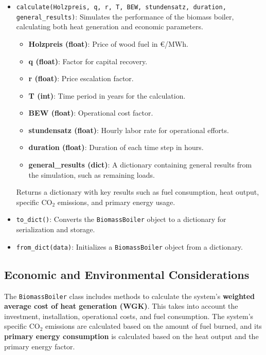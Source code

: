 \begin{itemize}
    \item \texttt{calculate(Holzpreis, q, r, T, BEW, stundensatz, duration, general\_results)}: Simulates the performance of the biomass boiler, calculating both heat generation and economic parameters.
    \begin{itemize}
        \item \textbf{Holzpreis (float)}: Price of wood fuel in €/MWh.
        \item \textbf{q (float)}: Factor for capital recovery.
        \item \textbf{r (float)}: Price escalation factor.
        \item \textbf{T (int)}: Time period in years for the calculation.
        \item \textbf{BEW (float)}: Operational cost factor.
        \item \textbf{stundensatz (float)}: Hourly labor rate for operational efforts.
        \item \textbf{duration (float)}: Duration of each time step in hours.
        \item \textbf{general\_results (dict)}: A dictionary containing general results from the simulation, such as remaining loads.
    \end{itemize}
    Returns a dictionary with key results such as fuel consumption, heat output, specific CO$_2$ emissions, and primary energy usage.

    \item \texttt{to\_dict()}: Converts the \texttt{BiomassBoiler} object to a dictionary for serialization and storage.

    \item \texttt{from\_dict(data)}: Initializes a \texttt{BiomassBoiler} object from a dictionary.
\end{itemize}

\subsection{Economic and Environmental Considerations}
The \texttt{BiomassBoiler} class includes methods to calculate the system’s \textbf{weighted average cost of heat generation (WGK)}. This takes into account the investment, installation, operational costs, and fuel consumption. The system’s specific CO$_2$ emissions are calculated based on the amount of fuel burned, and its \textbf{primary energy consumption} is calculated based on the heat output and the primary energy factor.


